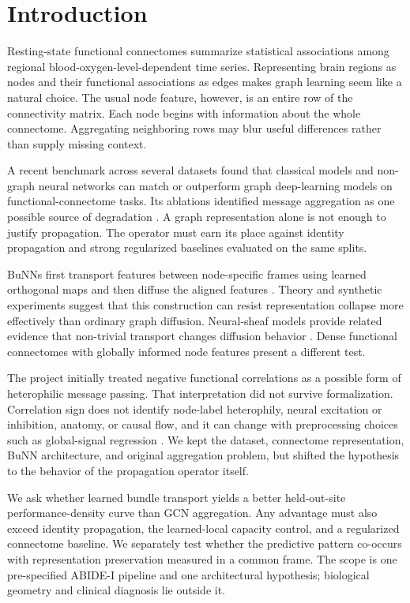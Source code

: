 \section{Introduction}

Resting-state functional connectomes summarize statistical associations among
regional blood-oxygen-level-dependent time series. Representing brain regions
as nodes and their functional associations as edges makes graph learning seem
like a natural choice. The usual node feature, however, is an entire row of the
connectivity matrix. Each node begins with information about the whole
connectome. Aggregating neighboring rows may blur useful differences rather
than supply missing context.

A recent benchmark across several datasets found that classical models and
non-graph neural networks can match or outperform graph deep-learning models
on functional-connectome tasks. Its ablations identified message aggregation
as one possible source of degradation \cite{han2026rethinking}. A graph
representation alone is not enough to justify propagation. The operator must
earn its place against identity propagation and strong regularized baselines
evaluated on the same splits.

BuNNs first transport features between node-specific frames using learned
orthogonal maps and then diffuse the aligned features
\cite{bamberger2025bundle}. Theory and synthetic experiments suggest that
this construction can resist representation collapse more effectively than
ordinary graph diffusion. Neural-sheaf models provide related evidence that
non-trivial transport changes diffusion behavior \cite{bodnar2022sheaf}.
Dense functional connectomes with globally informed node features present a
different test.

The project initially treated negative functional correlations as a possible
form of heterophilic message passing. That interpretation did not survive
formalization. Correlation sign does not identify node-label heterophily,
neural excitation or inhibition, anatomy, or causal flow, and it can change
with preprocessing choices such as global-signal regression
\cite{murphy2017global}. We kept the dataset, connectome representation, BuNN
architecture, and original aggregation problem, but shifted the hypothesis to
the behavior of the propagation operator itself.

We ask whether learned bundle transport yields a better held-out-site
performance-density curve than GCN aggregation. Any advantage must also exceed
identity propagation, the learned-local capacity control, and a regularized
connectome baseline. We separately test whether the predictive pattern
co-occurs with representation preservation measured in a common frame. The
scope is one pre-specified ABIDE-I pipeline and one architectural hypothesis;
biological geometry and clinical diagnosis lie outside it.

